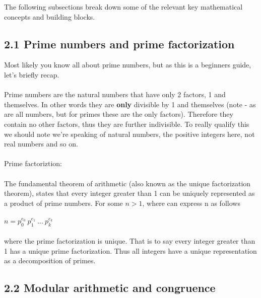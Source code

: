\documentclass[11pt]{article}   	%
\begin{document}
The following subsections break down some of the relevant key mathematical concepts and building blocks.

\subsection*{2.1 Prime numbers and prime factorization}

Most likely you know all about prime numbers, but as this is a beginners guide, let's briefly recap. \\
\\
Prime numbers are the natural numbers that have only 2 factors, 1 and themselves. In other words they are \textbf{only} divisible by 1 and themselves (note - as are all numbers, but for primes these are the only factors). Therefore they contain no other factors, thus they are further indivisible. To really qualify this we should note we're speaking of natural numbers, the positive integers here, not real numbers and so on. \\
\\
Prime factoriztion: \\
\\
The fundamental theorem of arithmetic (also known as the unique factorization theorem), states that every integer greater than 1 can be uniquely represented as a product of prime numbers. For some $ n > 1 $, where can express n as follows \\
\\
$ n = p_0^{e_0} \ p_1^{e_1} \ ... \ p_k^{e_k} $ \\
\\
where the prime factorization is unique. That is to say every integer greater than 1 has a unique prime factorization. Thus all integers have a unique representation as a decomposition of primes.


\subsection*{2.2 Modular arithmetic and congruence}
\end{document}
